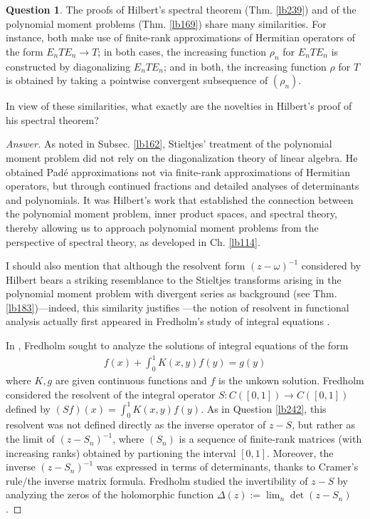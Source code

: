\documentclass[12pt,b5paper,notitlepage]{article}
\theoremstyle{definition}
\newtheorem{question}[df]{Question}
\theoremstyle{plain}
\numberwithin{equation}{section}
\begin{document}
\begin{question}\label{lb243}
The proofs of Hilbert's spectral theorem (Thm. \ref{lb239}) and of the polynomial moment problems (Thm. \ref{lb169}) share many similarities. For instance, both make use of finite-rank approximations of Hermitian operators of the form $E_nTE_n\rightarrow T$; in both cases, the increasing function $\rho_n$ for $E_nTE_n$ is constructed by diagonalizing $E_nTE_n$; and in both, the increasing function $\rho$ for $T$ is obtained by taking a pointwise convergent subsequence of $(\rho_n)$. 

In view of these similarities, what exactly are the novelties in Hilbert’s proof of his spectral theorem?
\end{question}


\begin{proof}[Answer]
As noted in Subsec. \ref{lb162}, Stieltjes' treatment of the polynomial moment problem did not rely on the diagonalization theory of linear algebra. He obtained Pad\'e approximations not via finite-rank approximations of Hermitian operators, but through continued fractions and detailed analyses of determinants and polynomials. It was Hilbert's work that established the connection between the polynomial moment problem, inner product spaces, and spectral theory, thereby allowing us to approach polynomial moment problems from the perspective of spectral theory, as developed in Ch. \ref{lb114}.

I should also mention that although the resolvent form $(z-\omega)^{-1}$ considered by Hilbert bears a striking resemblance to the Stieltjes transforms arising in the polynomial moment problem with divergent series as background (see Thm. \ref{lb183})---indeed, this similarity justifies ---the notion of resolvent in functional analysis actually first appeared in Fredholm's study of integral equations \cite{Fre03}. 

In \cite{Fre03}, Fredholm sought to analyze the solutions of integral equations of the form
\begin{align*}
f(x)+\int_0^1K(x,y)f(y)=g(y)
\end{align*}
where $K,g$ are given continuous functions and $f$ is the unkown solution. Fredholm considered the resolvent of the integral operator $S:C([0,1])\rightarrow C([0,1])$ defined by $(Sf)(x)=\int_0^1K(x,y)f(y)$. As in Question \ref{lb242}, this resolvent was not defined directly as the inverse operator of $z-S$, but rather as the limit of $(z-S_n)^{-1}$, where $(S_n)$ is a sequence of finite-rank matrices (with increasing ranks) obtained by partioning the interval $[0,1]$. Moreover, the inverse $(z-S_n)^{-1}$ was expressed in terms of determinants, thanks to Cramer's rule/the inverse matrix formula. Fredholm studied the invertibility of $z-S$ by analyzing the zeros of the holomorphic function $\Delta(z):=\lim_n \det(z-S_n)$.




\end{proof}
\end{document}
